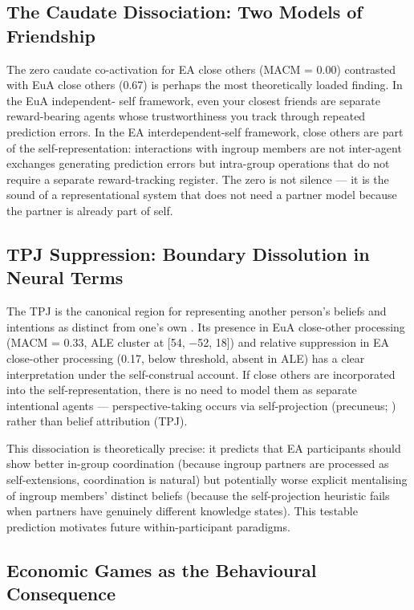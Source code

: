 \documentclass[11pt,a4paper]{article}
\begin{document}
\subsection{The Caudate Dissociation: Two Models of Friendship}

The zero caudate co-activation for EA close others (MACM = 0.00) contrasted with EuA
close others (0.67) is perhaps the most theoretically loaded finding. In the EuA independent-
self framework, even your closest friends are separate reward-bearing agents whose
trustworthiness you track through repeated prediction errors. In the EA interdependent-self
framework, close others are part of the self-representation: interactions with ingroup
members are not inter-agent exchanges generating prediction errors but intra-group operations
that do not require a separate reward-tracking register. The zero is not silence — it is
the sound of a representational system that does not need a partner model because the
partner is already part of self.

\subsection{TPJ Suppression: Boundary Dissolution in Neural Terms}

The TPJ is the canonical region for representing another person's beliefs and intentions
as distinct from one's own \citep{Saxe2003}. Its presence in EuA close-other processing
(MACM = 0.33, ALE cluster at [54, $-$52, 18]) and relative suppression in EA close-other
processing (0.17, below threshold, absent in ALE) has a clear interpretation under the
self-construal account. If close others are incorporated into the self-representation, there
is no need to model them as separate intentional agents — perspective-taking occurs via
self-projection (precuneus; \citealt{Buckner2007}) rather than belief attribution (TPJ).

This dissociation is theoretically precise: it predicts that EA participants should show
better in-group coordination (because ingroup partners are processed as self-extensions,
coordination is natural) but potentially worse explicit mentalising of ingroup members'
distinct beliefs (because the self-projection heuristic fails when partners have genuinely
different knowledge states). This testable prediction motivates future within-participant
paradigms.

\subsection{Economic Games as the Behavioural Consequence}
\end{document}
